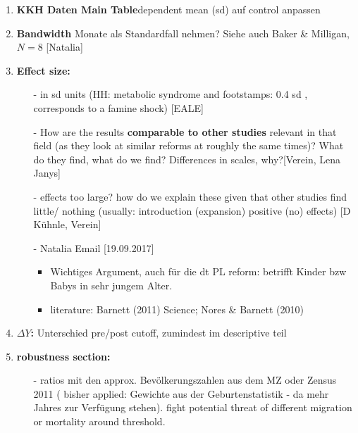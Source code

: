 \documentclass[11pt,a4paper]{article}
\begin{document}
{\begin{enumerate}
\item \textbf{KKH Daten Main Table}\newline dependent mean (sd) auf control anpassen


\item \textbf{Bandwidth} Monate als Standardfall nehmen? \newline
Siehe auch Baker \& Milligan, $N=8$ [Natalia]


\item \textbf{Effect size:}\vspace{-1em}
\begin{itemize}
	\item[-]in sd units (HH: metabolic syndrome and footstamps: 0.4 sd , corresponds to a famine 	shock) [EALE]
	\item[-] How are the results \textbf{comparable to other studies} relevant in that field (as 	they look at similar reforms at roughly the same times)? What do they find, what do we find? 	Differences in scales, why?[Verein, Lena Janys]
	\item[-] effects too large? how do we explain these given that other studies find little/	nothing (usually: introduction (expansion) positive (no) effects) [D Kühnle, Verein]
	\item[-] Natalia Email [19.09.2017]\vspace{-0.5em}
	\begin{itemize}
		\item Wichtiges Argument, auch für die dt PL reform: betrifft Kinder bzw Babys in sehr 	jungem 	Alter.
		\item literature: Barnett (2011) Science; Nores \& Barnett (2010) 
	\end{itemize}
\end{itemize}


\item \textbf{$\Delta Y$:}\newline
Unterschied pre/post cutoff, zumindest im descriptive teil


\item \textbf{robustness section:}\vspace{-1em}
\begin{itemize}
	\item[-] ratios mit den approx. Bevölkerungszahlen aus dem MZ oder Zensus 2011 ( bisher applied: Gewichte aus der Geburtenstatistik - da mehr Jahres zur Verfügung stehen). fight potential threat of different migration or mortality around threshold. 
\end{itemize}



\end{enumerate}}
\end{document}
